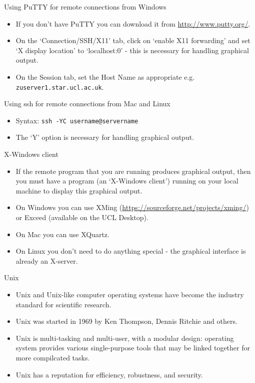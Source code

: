 \documentclass{beamer}
\newcommand{\command}[1]{\colorbox{light-gray}{\texttt{#1}}}
\begin{document}
\begin{frame}{Using PuTTY for remote connections from Windows}
  \begin{itemize}
    \item If you don't have PuTTY you can download it from \url{http://www.putty.org/}.
    \item On the `Connection/SSH/X11' tab, click on `enable X11 forwarding' and set `X display location' to `localhost:0' - this is necessary for handling graphical output.
    \item On the Session tab, set the Host Name as appropriate e.g. \texttt{zuserver1.star.ucl.ac.uk}.
  \end{itemize}
\end{frame}


\begin{frame}{Using ssh for remote connections from Mac and Linux}
  \begin{itemize}
    \item Syntax: \command{ssh -YC username@servername}
    \item The `Y' option is necessary for handling graphical output.
  \end{itemize}
\end{frame}


\begin{frame}{X-Windows client}
  \begin{itemize}
    \item If the remote program that you are running produces graphical output, then you must have a program (an `X-Windows client') running on your local machine to display this graphical output.
    \item On Windows you can use XMing (\url{https://sourceforge.net/projects/xming/}) or Exceed (available on the UCL Desktop).
    \item On Mac you can use XQuartz.
    \item On Linux you don't need to do anything special - the graphical interface is already an X-server.
  \end{itemize}
\end{frame}


\begin{frame}{Unix}
  \begin{itemize}
    \item Unix and Unix-like computer operating systems have become the industry standard for scientific research.
    \item Unix was started in 1969 by Ken Thompson, Dennis Ritchie and others.
    \item Unix is multi-tasking and multi-user, with a modular design: operating system provides various single-purpose tools that may be linked together for more compilcated tasks.
    \item Unix has a reputation for efficiency, robustness, and security.
   \end{itemize}
\end{frame}
\end{document}
